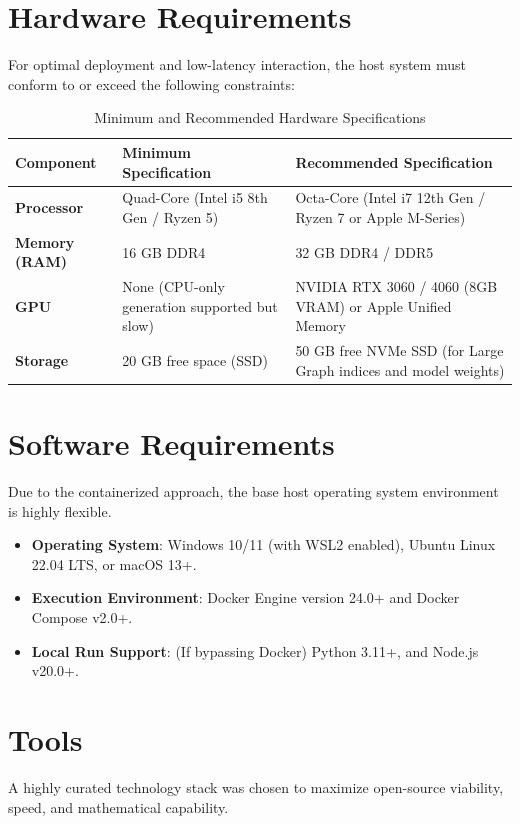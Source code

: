 \documentclass[12pt,a4paper]{report}
\begin{document}
\section{Hardware Requirements}
For optimal deployment and low-latency interaction, the host system must conform to or exceed the following constraints:
\begin{table}[htbp]
	\caption{Minimum and Recommended Hardware Specifications}
	\begin{center}
		\begin{tabular}{|p{3cm}|p{6cm}|p{6cm}|}
			\hline
			\textbf{Component} & \textbf{Minimum Specification} & \textbf{Recommended Specification} \\
			\hline
			\textbf{Processor} & Quad-Core (Intel i5 8th Gen / Ryzen 5) & Octa-Core (Intel i7 12th Gen / Ryzen 7 or Apple M-Series) \\
			\hline
            \textbf{Memory (RAM)} & 16 GB DDR4 & 32 GB DDR4 / DDR5 \\
			\hline
            \textbf{GPU} & None (CPU-only generation supported but slow) & NVIDIA RTX 3060 / 4060 (8GB VRAM) or Apple Unified Memory \\
			\hline
            \textbf{Storage} & 20 GB free space (SSD) & 50 GB free NVMe SSD (for Large Graph indices and model weights) \\
			\hline
		\end{tabular}
		\label{tab:hardware}
	\end{center}
\end{table}

\section{Software Requirements}
Due to the containerized approach, the base host operating system environment is highly flexible.
\begin{itemize}
    \item \textbf{Operating System}: Windows 10/11 (with WSL2 enabled), Ubuntu Linux 22.04 LTS, or macOS 13+.
    \item \textbf{Execution Environment}: Docker Engine version 24.0+ and Docker Compose v2.0+.
    \item \textbf{Local Run Support}: (If bypassing Docker) Python 3.11+, and Node.js v20.0+.
\end{itemize}

\section{Tools}
A highly curated technology stack was chosen to maximize open-source viability, speed, and mathematical capability.
\end{document}
